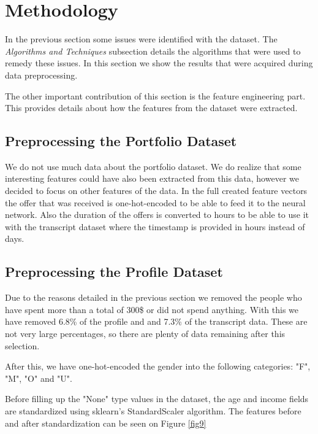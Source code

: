 \section{Methodology} \label{sec3}

In the previous section some issues were identified with the dataset. The \textit{Algorithms and Techniques} subsection details the algorithms that were used to remedy these issues. In this section we show the results that were acquired during data preprocessing.

The other important contribution of this section is the feature engineering part. This provides details about how the features from the dataset were extracted.

\subsection{Preprocessing the Portfolio Dataset}

We do not use much data about the portfolio dataset. We do realize that some interesting features could have also been extracted from this data, however we decided to focus on other features of the data. In the full created feature vectors the offer that was received is one-hot-encoded to be able to feed it to the neural network. Also the duration of the offers is converted to hours to be able to use it with the transcript dataset where the timestamp is provided in hours instead of days.

\subsection{Preprocessing the Profile Dataset}

Due to the reasons detailed in the previous section we removed the people who have spent more than a total of 300\$ or did not spend anything. With this we have removed 6.8\% of the profile and and 7.3\% of the transcript data. These are not very large percentages, so there are plenty of data remaining after this selection.

After this, we have one-hot-encoded the gender into the following categories: "F", "M", "O" and "U". 

Before filling up the "None" type values in the dataset, the age and income fields are standardized using sklearn's StandardScaler algorithm. The features before and after standardization can be seen on Figure \ref{fig9}

